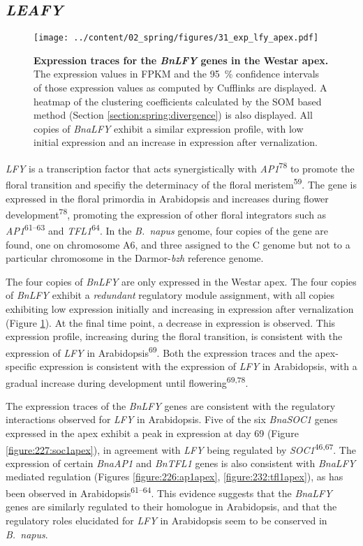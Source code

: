 \documentclass[12pt,]{book}
\begin{document}
\subsection{\texorpdfstring{\emph{LEAFY}}{LEAFY}}\label{section:spring:lfy}

\begin{figure}[htbp]
\centering
\texttt{[image: ../content/02\_spring/figures/31\_exp\_lfy\_apex.pdf]}
\caption{\textbf{Expression traces for the \emph{BnLFY} genes in the
Westar apex.} The expression values in FPKM and the 95~\% confidence
intervals of those expression values as computed by Cufflinks are
displayed. A heatmap of the clustering coefficients calculated by the
SOM based method (Section \ref{section:spring:divergence}) is also
displayed. All copies of \emph{BnaLFY} exhibit a similar expression
profile, with low initial expression and an increase in expression after
vernalization.}\label{figure:231:lfyapex}
\end{figure}

\emph{LFY} is a transcription factor that acts synergistically with
\emph{AP1}\textsuperscript{78} to promote the floral transition and
specifiy the determinacy of the floral meristem\textsuperscript{59}. The
gene is expressed in the floral primordia in Arabidopsis and increases
during flower development\textsuperscript{78}, promoting the expression
of other floral integrators such as \emph{AP1}\textsuperscript{61--63}
and \emph{TFL1}\textsuperscript{64}. In the \emph{B.~napus} genome, four
copies of the gene are found, one on chromosome A6, and three assigned
to the C genome but not to a particular chromosome in the
Darmor-\emph{bzh} reference genome.

The four copies of \emph{BnLFY} are only expressed in the Westar apex.
The four copies of \emph{BnLFY} exhibit a \emph{redundant} regulatory
module assignment, with all copies exhibiting low expression initially
and increasing in expression after vernalization (Figure
\ref{figure:231:lfyapex}). At the final time point, a decrease in
expression is observed. This expression profile, increasing during the
floral transition, is consistent with the expression of \emph{LFY} in
Arabidopsis\textsuperscript{69}. Both the expression traces and the
apex-specific expression is consistent with the expression of \emph{LFY}
in Arabidopsis, with a gradual increase during development until
flowering\textsuperscript{69,78}.

The expression traces of the \emph{BnLFY} genes are consistent with the
regulatory interactions observed for \emph{LFY} in Arabidopsis. Five of
the six \emph{BnaSOC1} genes expressed in the apex exhibit a peak in
expression at day 69 (Figure \ref{figure:227:soc1apex}), in agreement
with \emph{LFY} being regulated by \emph{SOC1}\textsuperscript{46,67}.
The expression of certain \emph{BnaAP1} and \emph{BnTFL1} genes is also
consistent with \emph{BnaLFY} mediated regulation (Figures
\ref{figure:226:ap1apex}, \ref{figure:232:tfl1apex}), as has been
observed in Arabidopsis\textsuperscript{61--64}. This evidence suggests
that the \emph{BnaLFY} genes are similarly regulated to their homologue
in Arabidopsis, and that the regulatory roles elucidated for \emph{LFY}
in Arabidopsis seem to be conserved in \emph{B.~napus}.
\end{document}
